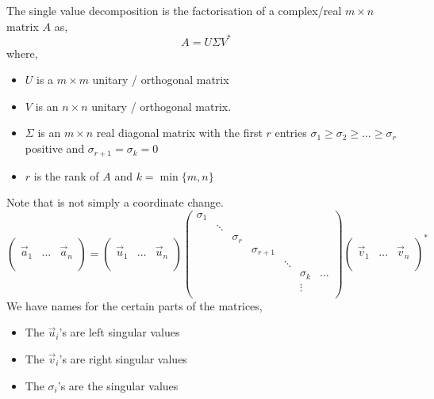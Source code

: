 \documentclass{article}
\begin{document}
The single value decomposition is the factorisation of a complex/real $m\times n$ matrix $A$ as,
$$ A = U\Sigma V^* $$
where,
\begin{itemize}
  \item $U$ is a $m\times m$ unitary / orthogonal matrix
  \item $V$ is an $n \times n$ unitary / orthogonal matrix.
  \item $\Sigma$ is an $m\times n$ real diagonal matrix with the first $r$ entries $\sigma_1 \ge \sigma_2 \ge \dots \ge \sigma_r$ positive and $\sigma_{r+1} = \sigma_k = 0$
  \item $r$ is the rank of $A$ and $k =\min\{m, n\}$
\end{itemize}
Note that is not simply a coordinate change.\\

$$ \begin{pmatrix}
  \\ \vec{a}_1 & \dots & \vec{a}_n \\\\
\end{pmatrix} = \begin{pmatrix}
  \\ \vec{u}_1 & \dots & \vec{u}_n \\\\
\end{pmatrix} \begin{pmatrix}
  \sigma_1 &  &  &  &  & &\\
  & \ddots & & & & &\\
  & & \sigma_r & & & &\\
  & & & \sigma_{r+1} & & & \\
  & & & & \ddots & &\\
  & & & & & \sigma_k & \dots \\
  & & & & & \vdots & \\
\end{pmatrix} \begin{pmatrix}
  \\ \vec{v}_1 & \dots & \vec{v}_n \\\\
\end{pmatrix} ^ *$$
We have names for the certain parts of the matrices,
\begin{itemize}
  \item The $\vec u_i$'s are left singular values
  \item The $\vec v_i$'s are right singular values
  \item The $\sigma_i$'s are the singular values
\end{itemize}
\end{document}
